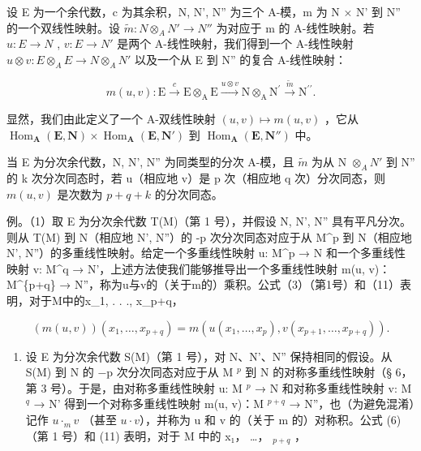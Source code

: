 设 E 为一个余代数，c 为其余积，N, N', N'' 为三个 A-模，m 为 N × N' 到 N'' 的一个双线性映射。设 \(\tilde{m}:N \otimes_{A} N' \to N''\) 为对应于 m 的 A-线性映射。若 \(u:E \to N\) , \(v:E \to N'\) 是两个 A-线性映射，我们得到一个 A-线性映射 \(u \otimes v:E \otimes_{A} E \to N \otimes_{A} N'\) 以及一个从 E 到 N'' 的复合 A-线性映射：

\[
m (u, v): \mathrm{E} \xrightarrow {c} \mathrm{E} \otimes_ {\mathrm{A}} \mathrm{E} \xrightarrow {u \otimes v} \mathrm{N} \otimes_ {\mathrm{A}} \mathrm{N} ^ {\prime} \xrightarrow {\tilde {m}} \mathrm{N} ^ {\prime \prime}.\tag{11}
\]

显然，我们由此定义了一个 A-双线性映射 \((u, v) \mapsto m(u, v)\) ，它从 \(\operatorname{Hom}_{\mathbf{A}}(\mathbf{E}, \mathbf{N}) \times \operatorname{Hom}_{\mathbf{A}}(\mathbf{E}, \mathbf{N}')\) 到 \(\operatorname{Hom}_{\mathbf{A}}(\mathbf{E}, \mathbf{N}'')\) 中。

当 E 为分次余代数，N, N', N'' 为同类型的分次 A-模，且 \(\tilde{m}\) 为从 N \(\otimes_{A}N'\) 到 N'' 的 k 次分次同态时，若 u（相应地 v）是 p 次（相应地 q 次）分次同态，则 \(m(u,v)\) 是次数为 \(p + q + k\) 的分次同态。

例。（1）取 E 为分次余代数 T(M)（第 1 号），并假设 N, N', N'' 具有平凡分次。则从 T(M) 到 N（相应地 N', N''）的 -p 次分次同态对应于从 M\^{}p 到 N（相应地 N', N''）的多重线性映射。给定一个多重线性映射 u: M\^{}p → N 和一个多重线性映射 v: M\^{}q → N'，上述方法使我们能够推导出一个多重线性映射 m(u, v)：M\^{}\{p+q\} → N''，称为u与v的（关于m的）乘积。公式（3）（第1号）和（11）表明，对于M中的x\_1, . . ., x\_p+q，

\[
(m (u, v)) \left(x _ {1}, \dots , x _ {p + q}\right) = m \left(u \left(x _ {1}, \dots , x _ {p}\right), v \left(x _ {p + 1}, \dots , x _ {p + q}\right)\right).
\]

\begin{enumerate}
\def\labelenumi{(\arabic{enumi})}
\setcounter{enumi}{1}
\tightlist
\item
  设 E 为分次余代数 S(M)（第 1 号），对 N、N'、N'' 保持相同的假设。从 S(M) 到 N 的 −p 次分次同态对应于从 M \(^{p}\) 到 N 的对称多重线性映射（§ 6，第 3 号）。于是，由对称多重线性映射 u: M \(^{p}\) → N 和对称多重线性映射 v: M \(^{q}\) → N' 得到一个对称多重线性映射 m(u, v)：M \(^{p+q}\) → N''，也（为避免混淆）记作 \(u \cdot_{m} v\) （甚至 \(u \cdot v\)），并称为 u 和 v 的（关于 m 的）对称积。公式 (6)（第 1 号）和 (11) 表明，对于 M 中的 x₁， \ldots， \(_{p+q}\) ，
\end{enumerate}

